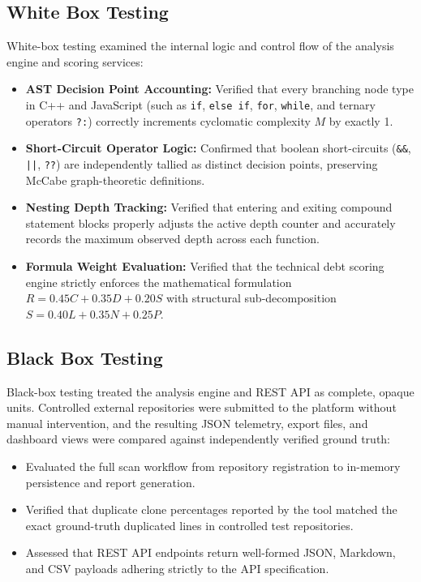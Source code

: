 \subsection{White Box Testing}
White-box testing examined the internal logic and control flow of the analysis engine and scoring services:
\begin{itemize}
    \item \textbf{AST Decision Point Accounting:} Verified that every branching node type in C++ and JavaScript (such as \texttt{if}, \texttt{else if}, \texttt{for}, \texttt{while}, and ternary operators \texttt{?:}) correctly increments cyclomatic complexity $M$ by exactly 1.
    \item \textbf{Short-Circuit Operator Logic:} Confirmed that boolean short-circuits (\texttt{\&\&}, \texttt{||}, \texttt{??}) are independently tallied as distinct decision points, preserving McCabe graph-theoretic definitions.
    \item \textbf{Nesting Depth Tracking:} Verified that entering and exiting compound statement blocks properly adjusts the active depth counter and accurately records the maximum observed depth across each function.
    \item \textbf{Formula Weight Evaluation:} Verified that the technical debt scoring engine strictly enforces the mathematical formulation $R = 0.45C + 0.35D + 0.20S$ with structural sub-decomposition $S = 0.40L + 0.35N + 0.25P$.
\end{itemize}

\subsection{Black Box Testing}
Black-box testing treated the analysis engine and REST API as complete, opaque units. Controlled external repositories were submitted to the platform without manual intervention, and the resulting JSON telemetry, export files, and dashboard views were compared against independently verified ground truth:
\begin{itemize}
    \item Evaluated the full scan workflow from repository registration to in-memory persistence and report generation.
    \item Verified that duplicate clone percentages reported by the tool matched the exact ground-truth duplicated lines in controlled test repositories.
    \item Assessed that REST API endpoints return well-formed JSON, Markdown, and CSV payloads adhering strictly to the API specification.
\end{itemize}

